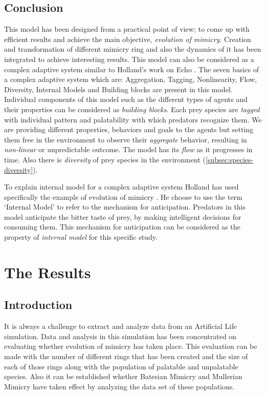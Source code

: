 \documentclass[letterpaper]{article}
\numberwithin{equation}{section}
\begin{document}
\subsection{Conclusion}
This model has been designed from a practical point of view; to come up with efficient results and achieve the main objective, \textit{evolution of mimicry}. Creation and transformation of different mimicry ring and also the dynamics of it has been integrated to achieve interesting results. This model can also be considered as a complex adaptive system similar to Holland's work on Echo \cite{holland1996}. The seven basics of a complex adaptive system which are: Aggregation, Tagging, Nonlinearity, Flow, Diversity, Internal Models and Building blocks \cite{holland1996} are present in this model. Individual components of this model such as the different types of agents and their properties can be considered as \textit{building blocks}. Each prey species are \textit{tagged} with individual pattern and palatability with which predators recognize them. We are providing different properties, behaviors and goals to the agents but setting them free in the environment to observe their \textit{aggregate} behavior, resulting in \textit{non-linear} or unpredictable outcome. The model has its \textit{flow} as it progresses in time. Also there is \textit{diversity} of prey species in the environment (\ref{subsec:species-diversity}).

To explain internal model for a complex adaptive system Holland has used specifically the example of evolution of mimicry \cite{holland1996}. He choose to use the term `Internal Model' to refer to the mechanism for anticipation. Predators in this model anticipate the bitter taste of prey, by making intelligent decisions for consuming them. This mechanism for anticipation can be considered as the property of \textit{internal model} for this specific study.

\section{The Results}
\label{section:results}

\subsection{Introduction}
It is always a challenge to extract and analyze data from an Artificial Life simulation. Data and analysis in this simulation has been concentrated on evaluating whether evolution of mimicry has taken place. This evaluation can be made with the number of different rings that has been created and the size of each of those rings along with the population of palatable and unpalatable species. Also it can be established whether Batesian Mimicry and Mullerian Mimicry have taken effect by analyzing the data set of these populations.
\end{document}
